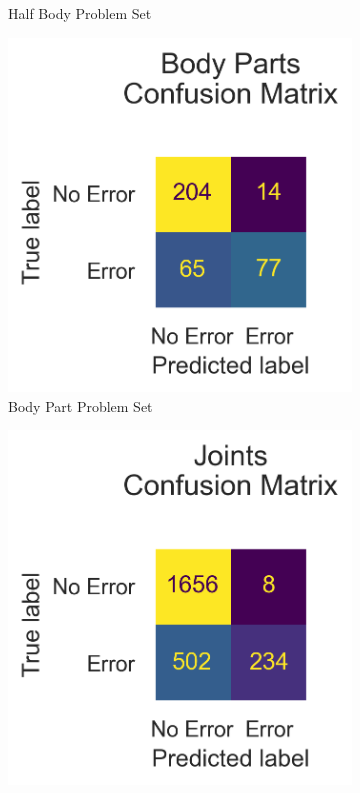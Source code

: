 \begin{figure}[ht]
\begin{subfigure}[b]{0.47\linewidth}
      \caption[]{Half Body Problem Set}
      \label{fig:hb_conf_v1}
  \end{subfigure}
  \hfill
  \begin{subfigure}[b]{0.47\linewidth}
      \centering
      \includegraphics[width=\textwidth]{figures/Results/v1_bs_60_is_64_e_100/confusion/body_parts_together.png}
      \caption[]{Body Part Problem Set}
      \label{fig:bp_conf_v1}
  \end{subfigure}
  \hfill
  \begin{subfigure}[b]{0.47\linewidth}
      \centering
      \includegraphics[width=\textwidth]{figures/Results/v1_bs_60_is_64_e_100/confusion/joints_together.png}

\end{subfigure}
\end{figure}
